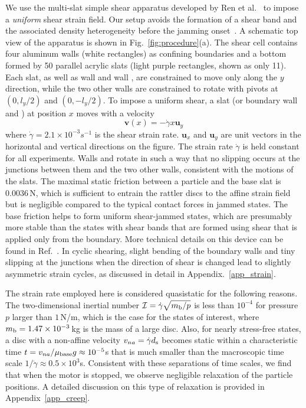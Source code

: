 \documentclass[twocolumn,showkeys,superscriptaddress,preprintnumbers,amsmath,amssymb,showpacs,prx,longbibliography]{revtex4-2}
\def\X#1{
        \raisebox{.9pt}{\textcircled{\raisebox{-.9pt}{#1}}}
}
\begin{document}
\begin{CJK*}{UTF8}{gbsn}
We use the multi-slat simple shear apparatus developed by Ren et al.~\cite{Ren2013_prl} to impose a {\it uniform} shear strain field. Our setup avoids the formation of a shear band and the associated density heterogeneity before the jamming onset~\cite{Ren2013_prl}. A schematic top view of the apparatus is shown in Fig.~\ref{fig:procedure}(a). The shear cell contains four aluminum walls (white rectangles) as confining boundaries and a bottom formed by 50 parallel acrylic slats (light purple rectangles, shown as only 11).
Each slat, as well as wall \X1 and wall \X2, are constrained to move only along the $y$ direction, while the two other walls are constrained to rotate with pivots at $(0,l_y/2)$ and $(0,-l_y/2)$.  To impose a uniform shear, a slat (or boundary wall \X1  and \X2) at position $x$ moves with a velocity
\begin{equation}\label{eq:strain_rate}
    \mathbf{v}(x)=-\dot{\gamma} x\mathbf{u}_y
\end{equation}
where $\dot{\gamma}=2.1\times 10^{-3}s^{-1}$ is the shear strain rate. $\mathbf{u}_x$ and $\mathbf{u}_y$ are unit vectors in the horizontal and vertical directions on the figure.
The strain rate $\dot{\gamma}$ is held constant for all experiments. Walls \X3 and \X4 rotate in such a way that no slipping occurs at the junctions between them and the two other walls, consistent with the motions of the slats. The maximal static friction between a particle and the base slat is $0.0036\,$N, which is sufficient to entrain the rattler discs to the affine strain field but is negligible compared to the typical contact forces in jammed states. 
{\color{black} 
The base friction helps to form uniform shear-jammed states, which are presumably more stable than the states with shear bands that are formed using shear that is applied only from the boundary.}
More technical details on this device can be found in Ref.~\cite{ren2013_thesis,wang2018_phd}. In cyclic shearing, slight bending of the boundary walls 
and tiny slipping at the junctions when the direction of shear is changed lead to slightly asymmetric strain cycles, as discussed in detail in Appendix.~\ref{app_strain}.

The strain rate employed here is considered quasistatic for the following reasons. The two-dimensional inertial number $\mathcal{I}=\dot{\gamma}\sqrt{m_{\rm b}/p}$ is less than $10^{-4}$ for pressure $p$ larger than $1\,$N/m, which is the case for the states of interest, where $m_{\rm b}=1.47\times 10^{-3}\,$kg is the mass of a large disc. Also, for nearly stress-free states, a disc with a non-affine velocity $v_{na}=\dot{\gamma}d_{\rm s}$ becomes static within a characteristic time $t=v_{na}/\mu_{\rm base} g\approx10^{-5}$s that is much smaller than the macroscopic time scale $1/\dot{\gamma}\approx 0.5\times10^3$s. 
Consistent with these separations of time scales, we find that when the motor is stopped, we observe negligible relaxation of the particle positions. A detailed discussion on this type of relaxation is provided in Appendix~\ref{app_creep}.



\end{CJK*}
\end{document}
